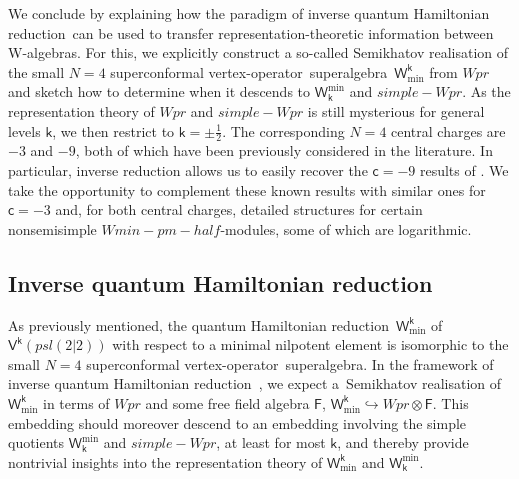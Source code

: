\documentclass[10pt,a4paper]{amsart}
\numberwithin{equation}{section}
\newcommand{\cc}{\mathsf{c}} %
\newcommand{\kk}{\mathsf{k}} %
\newcommand{\alg}[1]{\mathfrak{#1}} %
\newcommand{\VOA}[1]{\mathsf{#1}} %
\newcommand{\SLSA}[3]{\alg{#1}_{#2 \vert #3}} %
\newcommand{\psl}{\SLSA{psl}{2}{2}}
\newcommand{\uaff}[2]{\VOA{V}^{#1}(#2)} %
\newcommand{\upsl}[1][\kk]{\uaff{#1}{\psl}} %
\newcommand{\uwalg}[2]{\VOA{W}^{#1}_{\mathrm{#2}}} %
\newcommand{\swalg}[2]{\VOA{W}_{#1}^{\mathrm{#2}}} %
\newcommand{\upr}[1][\kk]{\uwalg{#1}{pr}} %
\newcommand{\umin}[1][\kk]{\uwalg{#1}{min}} %
\newcommand{\spr}[1][\kk]{\swalg{#1}{pr}} %
\newcommand{\smin}[1][\kk]{\swalg{#1}{min}} %
\newcommand{\sminpmhalf}{\smin[\pm 1/2]}
\newcommand{\vo}{vertex-operator}
\newcommand{\svoa}{\vo\ superalgebra}
\newcommand{\qhr}{quantum Hamiltonian reduction} %
\def\smash#1{#1}
\def\psl{psl(2|2)}
\def\upr{Wpr}
\def\spr{simple-Wpr}
\def\sminpmhalf{Wmin-pm-half}
\def\qhr{quantum Hamiltonian reduction}
\begin{document}
We conclude by explaining how the paradigm of inverse \qhr\ can be used to transfer representation-theoretic information between W-algebras.
For this, we explicitly construct a so-called Semikhatov realisation of the small $N=4$ superconformal \svoa\ $\umin$ from \smash{$\upr$} and sketch how to determine when it descends to $\smin$ and $\spr$.
As the representation theory of \smash{$\upr$} and $\spr$ is still mysterious for general levels $\kk$, we then restrict to $\kk=\pm\frac{1}{2}$.
The corresponding $N=4$ central charges are $-3$ and $-9$, both of which have been previously considered in the literature.
In particular, inverse reduction allows us to easily recover the $\cc=-9$ results of \cite{AdaRea14,AdaVer20}.
We take the opportunity to complement these known results with similar ones for $\cc=-3$ and, for both central charges, detailed structures for certain nonsemisimple \smash{$\sminpmhalf$}-modules, some of which are logarithmic.

\subsection{Inverse \qhr} \label{sec:iqhr}

As previously mentioned, the \qhr\ $\umin$ of \smash{$\upsl$} with respect to a minimal nilpotent element is isomorphic to the small $N=4$ superconformal \svoa.
In the framework of inverse \qhr\ \cite{AdaRea17,SemInv94}, we expect a~Semikhatov realisation of $\umin$ in terms of \smash{$\upr$} and some free field algebra $\VOA{F}$,
$\umin \hookrightarrow \upr \otimes \VOA{F}$.
This embedding should moreover descend to an embedding involving the simple quotients $\smin$ and $\spr$, at least for most $\kk$, and thereby provide nontrivial insights into the representation theory of $\umin$ and $\smin$.
\end{document}
